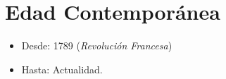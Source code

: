 \section{Edad Contemporánea}

\begin{itemize}

\item Desde: 1789 (\emph{Revolución Francesa})
\item Hasta: Actualidad.

\end{itemize}


\newpage
